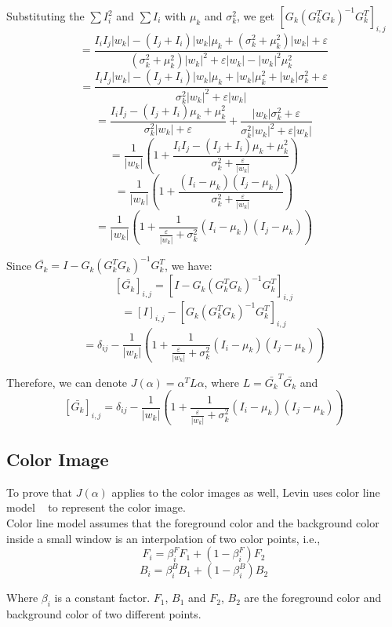 \documentclass[11pt,letterpaper]{article}
\begin{document}
Substituting the $\sum I_i^2$ and $\sum I_i$ with $\mu_k$ and $\sigma_k^2$, we get
$[G_k(G_k^TG_k)^{-1}G_k^T]_{i, j}$
$$= \frac{I_i I_j |w_k| - (I_j + I_i)|w_k|\mu_k + (\sigma_k^2 + \mu_k^2)|w_k| + \varepsilon}{(\sigma_k^2 + \mu_k^2)|w_k|^2 + \varepsilon|w_k| - |w_k|^2\mu_k^2} $$
$$ = \frac{I_i I_j |w_k| - (I_j + I_i)|w_k|\mu_k + |w_k|\mu_k^2 + |w_k|\sigma_k^2 + \varepsilon}{\sigma_k^2|w_k|^2 + \varepsilon|w_k|}$$
$$ = \frac{I_i I_j - (I_j + I_i)\mu_k + \mu_k^2}{\sigma_k^2|w_k| + \varepsilon} + 
\frac{|w_k|\sigma_k^2 + \varepsilon}{\sigma_k^2|w_k|^2 + \varepsilon|w_k|}$$
$$ = \frac{1}{|w_k|}(1 + \frac{I_i I_j - (I_j + I_i)\mu_k + \mu_k^2}{\sigma_k^2 + \frac{\varepsilon}{|w_k|}})$$
$$= \frac{1}{|w_k|}(1 + \frac{(I_i - \mu_k)(I_j - \mu_k)}{\sigma_k^2 + \frac{\varepsilon}{|w_k|}})$$
$$= \frac{1}{|w_k|}(1 + \frac{1}{\frac{\varepsilon}{|w_k|} + \sigma_k^2}(I_i - \mu_k)(I_j - \mu_k))$$

Since $\bar{G_k} = I - G_k(G_k^TG_k)^{-1}G_k^T$, we have:
$$[\bar{G_k}]_{i,j} = [I - G_k(G_k^TG_k)^{-1}G_k^T]_{i,j} $$
$$= [I]_{i,j} - [G_k(G_k^TG_k)^{-1}G_k^T]_{i,j}$$
$$= \delta_{ij} - \frac{1}{|w_k|}(1 + \frac{1}{\frac{\varepsilon}{|w_k|} + \sigma_k^2}(I_i - \mu_k)(I_j - \mu_k))$$

Therefore, we can denote $J(\alpha) = \alpha^T L \alpha$, where $L = \bar{G_k}^T\bar{G_k}$ and 
$$[\bar{G_k}]_{i,j} = \delta_{ij} - \frac{1}{|w_k|}(1 + \frac{1}{\frac{\varepsilon}{|w_k|} + \sigma_k^2}(I_i - \mu_k)(I_j - \mu_k))$$

\subsection{Color Image}

To prove that $J(\alpha)$ applies to the color images as well, Levin uses color line model ~\cite{Omer:2004} to represent the color image. \\

Color line model assumes that the foreground color and the background color inside a small window is an interpolation of two color points, i.e.,
\begin{equation}
F_i = \beta^F_{i} F_1 + (1-\beta^F_{i})F_2
\end{equation}
\begin{equation}
B_i = \beta^B_{i} B_1 + (1-\beta^B_{i})B_2
\end{equation}

Where $\beta_i$ is a constant factor. $F_1$, $B_1$ and $F_2$, $B_2$ are the foreground color and background color of two different points.\\
\end{document}
